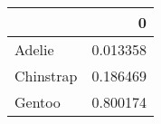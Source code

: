 \begin{tabular}{lr}
\toprule
{} &         0 \\
\midrule
Adelie    &  0.013358 \\
Chinstrap &  0.186469 \\
Gentoo    &  0.800174 \\
\bottomrule
\end{tabular}
